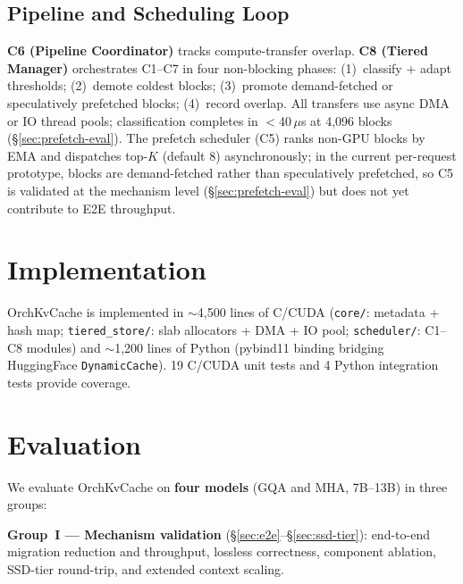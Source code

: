 \documentclass[conference]{IEEEtran}
\begin{document}
\subsection{Pipeline and Scheduling Loop}
\label{sec:pipeline}
\label{sec:sched-loop}

\textbf{C6 (Pipeline Coordinator)} tracks compute-transfer overlap. \textbf{C8 (Tiered Manager)} orchestrates C1--C7 in four non-blocking phases: (1)~classify + adapt thresholds; (2)~demote coldest blocks; (3)~promote demand-fetched or speculatively prefetched blocks; (4)~record overlap. All transfers use async DMA or IO thread pools; classification completes in $<$40\,$\mu$s at 4,096 blocks (\S\ref{sec:prefetch-eval}). The prefetch scheduler (C5) ranks non-GPU blocks by EMA and dispatches top-$K$ (default 8) asynchronously; in the current per-request prototype, blocks are demand-fetched rather than speculatively prefetched, so C5 is validated at the mechanism level (\S\ref{sec:prefetch-eval}) but does not yet contribute to E2E throughput.

\section{Implementation}

OrchKvCache is implemented in ${\sim}$4,500 lines of C/CUDA (\texttt{core/}: metadata + hash map; \texttt{tiered\_store/}: slab allocators + DMA + IO pool; \texttt{scheduler/}: C1--C8 modules) and ${\sim}$1,200 lines of Python (pybind11 binding bridging HuggingFace \texttt{DynamicCache}). 19 C/CUDA unit tests and 4 Python integration tests provide coverage.

\section{Evaluation}

We evaluate OrchKvCache on \textbf{four models} (GQA and MHA, 7B--13B) in three groups:

\noindent\textbf{Group~I --- Mechanism validation} (\S\ref{sec:e2e}--\S\ref{sec:ssd-tier}): end-to-end migration reduction and throughput, lossless correctness, component ablation, SSD-tier round-trip, and extended context scaling.
\end{document}
